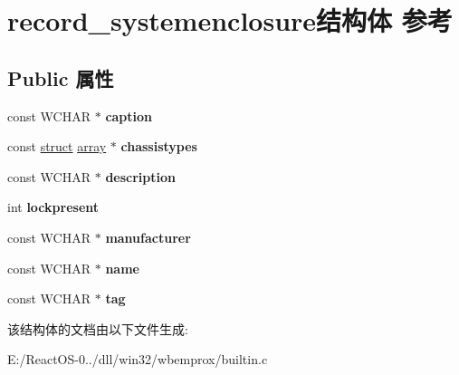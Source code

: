 \hypertarget{structrecord__systemenclosure}{}\section{record\+\_\+systemenclosure结构体 参考}
\label{structrecord__systemenclosure}
\subsection*{Public 属性}
\begin{DoxyCompactItemize}
\item 
\mbox{\label{structrecord__systemenclosure_a29b935ec3f309d09c861976e6f7d9d25}} 
const W\+C\+H\+AR $\ast$ {\bfseries caption}
\item 
\mbox{\label{structrecord__systemenclosure_acf82bd37630a4816a90fab8a67c0432a}} 
const \hyperlink{interfacestruct}{struct} \hyperlink{structarray}{array} $\ast$ {\bfseries chassistypes}
\item 
\mbox{\label{structrecord__systemenclosure_ae048d9835af04c3ff6aa982cdd7b0eb0}} 
const W\+C\+H\+AR $\ast$ {\bfseries description}
\item 
\mbox{\label{structrecord__systemenclosure_aefead2b10517a0a9c4765fe4f859d00b}} 
int {\bfseries lockpresent}
\item 
\mbox{\label{structrecord__systemenclosure_a5ad1e19b29ec938d40623e9f06714371}} 
const W\+C\+H\+AR $\ast$ {\bfseries manufacturer}
\item 
\mbox{\label{structrecord__systemenclosure_ab602f7c1176f83805c31650ed813ebc6}} 
const W\+C\+H\+AR $\ast$ {\bfseries name}
\item 
\mbox{\label{structrecord__systemenclosure_a7f692fb5dd848dab23da190810c11d8a}} 
const W\+C\+H\+AR $\ast$ {\bfseries tag}
\end{DoxyCompactItemize}


该结构体的文档由以下文件生成\+:\begin{DoxyCompactItemize}
\item 
E\+:/\+React\+O\+S-\/0../dll/win32/wbemprox/builtin.\+c\end{DoxyCompactItemize}
